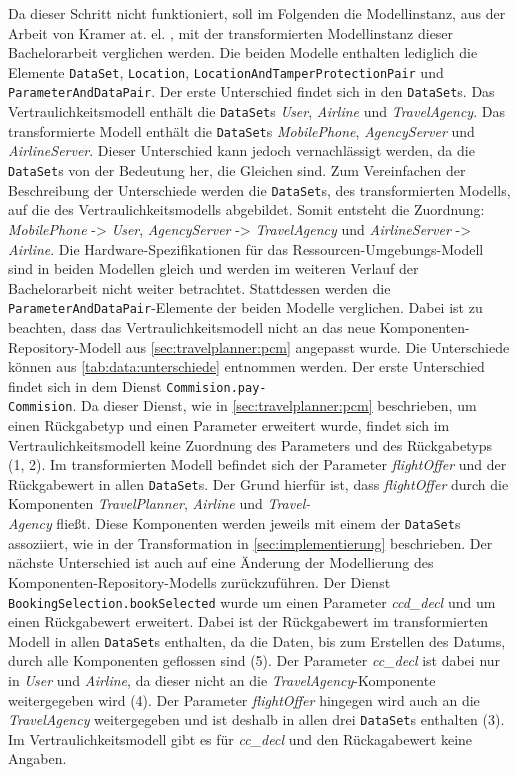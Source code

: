 Da dieser Schritt nicht funktioniert, soll im Folgenden die Modellinstanz, aus der Arbeit von Kramer at. el. \cite{Kramera}, mit der transformierten Modellinstanz dieser Bachelorarbeit verglichen werden. Die beiden Modelle enthalten lediglich die Elemente \texttt{DataSet}, \texttt{Location}, \texttt{LocationAndTamperProtectionPair} und \texttt{ParameterAndDataPair}. Der erste Unterschied findet sich in den \texttt{DataSet}s. Das Vertraulichkeitsmodell enthält die \texttt{DataSet}s \textit{User}, \textit{Airline} und \textit{TravelAgency}. Das transformierte Modell enthält die \texttt{DataSet}s \textit{MobilePhone}, \textit{AgencyServer} und \textit{AirlineServer}. Dieser Unterschied kann jedoch vernachlässigt werden, da die \texttt{DataSet}s von der Bedeutung her, die Gleichen sind. Zum Vereinfachen der Beschreibung der Unterschiede werden die \texttt{DataSet}s, des transformierten Modells, auf die des Vertraulichkeitsmodells abgebildet. Somit entsteht die Zuordnung: \textit{MobilePhone} -> \textit{User}, \textit{AgencyServer} -> \textit{TravelAgency} und \textit{AirlineServer} -> \textit{Airline}. Die Hardware-Spezifikationen für das Ressourcen-Umgebungs-Modell sind in beiden Modellen gleich und werden im weiteren Verlauf der Bachelorarbeit nicht weiter betrachtet. Stattdessen werden die \texttt{ParameterAndDataPair}-Elemente der beiden Modelle verglichen. Dabei ist zu beachten, dass das Vertraulichkeitsmodell nicht an das neue Komponenten-Repository-Modell aus \autoref{sec:travelplanner:pcm} angepasst wurde. Die Unterschiede können aus \autoref{tab:data:unterschiede} entnommen werden. Der erste Unterschied findet sich in dem Dienst \texttt{Commision.pay-\\Commision}. Da dieser Dienst, wie in \autoref{sec:travelplanner:pcm} beschrieben, um einen Rückgabetyp und einen Parameter erweitert wurde, findet sich im Vertraulichkeitsmodell keine Zuordnung des Parameters und des Rückgabetyps (1, 2). Im transformierten Modell befindet sich der Parameter \textit{flightOffer} und der Rückgabewert in allen \texttt{DataSet}s. Der Grund hierfür ist, dass \textit{flightOffer} durch die Komponenten \textit{TravelPlanner}, \textit{Airline} und \textit{Travel-\\Agency} fließt. Diese Komponenten werden jeweils mit einem der \texttt{DataSet}s assoziiert, wie in der Transformation in \autoref{sec:implementierung} beschrieben. Der nächste Unterschied ist auch auf eine Änderung der Modellierung des Komponenten-Repository-Modells zurückzuführen. Der Dienst \texttt{BookingSelection.bookSelected} wurde um einen Parameter \textit{ccd\_decl} und um einen Rückgabewert erweitert. Dabei ist der Rückgabewert im transformierten Modell in allen \texttt{DataSet}s enthalten, da die Daten, bis zum Erstellen des Datums, durch alle Komponenten geflossen sind (5). Der Parameter \textit{cc\_decl} ist dabei nur in \textit{User} und \textit{Airline}, da dieser nicht an die \textit{TravelAgency}-Komponente weitergegeben wird (4). Der Parameter \textit{flightOffer} hingegen wird auch an die \textit{TravelAgency} weitergegeben und ist deshalb in allen drei \texttt{DataSet}s enthalten (3). Im Vertraulichkeitsmodell gibt es für \textit{cc\_decl} und den Rückagabewert keine Angaben. 